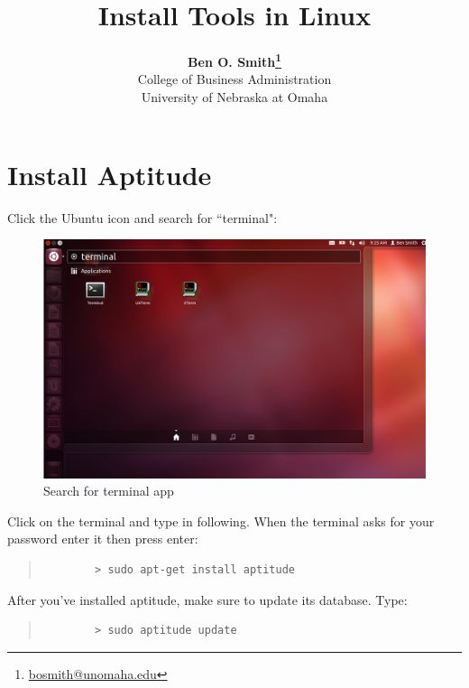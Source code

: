\documentclass[11pt]{article}
\begin{document}
 

\title{Install Tools in Linux}
\date{}
\author{\textbf{Ben O. Smith\footnote{\href{mailto:bosmith@unomaha.edu}{bosmith@unomaha.edu}}} \\
College of Business Administration \\
University of Nebraska at Omaha}
\maketitle \doublespace

\section{Install Aptitude}

Click the Ubuntu icon and search for ``terminal":

\begin{figure}[!h]
	\centering
	\includegraphics[width=5in]{graphics/OpenTerminal.png}	\caption{Search for terminal app}
\end{figure}

Click on the terminal and type in following. When the terminal asks for your password enter it then press enter:

\begin{quote}
	\begin{verbatim}
		> sudo apt-get install aptitude
	\end{verbatim}
\end{quote}

After you've installed aptitude, make sure to update its database. Type:

\begin{quote}
	\begin{verbatim}
		> sudo aptitude update
	\end{verbatim}
\end{quote}
\end{document}
